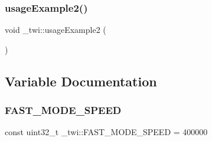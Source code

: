 \subsubsection{\texorpdfstring{usage\+Example2()}{usageExample2()}}
{\footnotesize\ttfamily void \+\_\+twi\+::usage\+Example2 (\begin{DoxyParamCaption}{ }\end{DoxyParamCaption})}



\subsection{Variable Documentation}
\hypertarget{namespace__twi_aab54acbb0fdd75e47c23e8dc3344f02e}{}\label{namespace__twi_aab54acbb0fdd75e47c23e8dc3344f02e} 
\subsubsection{\texorpdfstring{F\+A\+S\+T\+\_\+\+M\+O\+D\+E\+\_\+\+S\+P\+E\+ED}{FAST\_MODE\_SPEED}}
{\footnotesize\ttfamily const uint32\+\_\+t \+\_\+twi\+::\+F\+A\+S\+T\+\_\+\+M\+O\+D\+E\+\_\+\+S\+P\+E\+ED = 400000}

